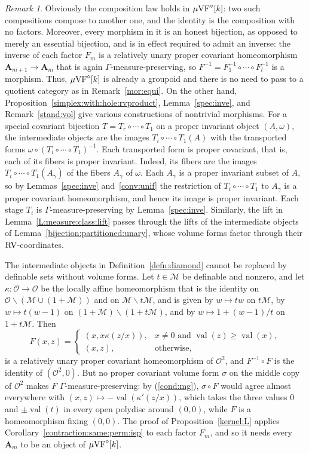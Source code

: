 \documentclass[12pt]{amsart}
\theoremstyle{plain}
\theoremstyle{definition}
\theoremstyle{remark}
\newtheorem{rem}[thm]{Remark}
\numberwithin{equation}{section}
\theoremstyle{plain}
\newcommand{\VF}{\textup{VF}}
\newcommand{\RV}{\textup{RV}}
\newcommand{\MM}{\mdl M}
\newcommand{\OO}{\mdl O}
\newcommand{\0}{\emptyset}
\newcommand{\mdl}[1]{\mathcal{#1}}  %
\newcommand{\fun}{\longrightarrow}
\newcommand{\efun}{\longmapsto}
\newcommand{\mi}{\smallsetminus}
\newcommand{\mVF}{{\mu}{\VF}}
\newcommand{\mgVF}{{\mu} {\VF}}
\DeclareMathOperator{\vv}{val}
\begin{document}
\begin{rem}\label{dia:cat:well}
Obviously the composition law holds in $\mgVF^{\diamond}[k]$: two such compositions compose to another one, and the identity is the composition with no factors. Moreover, every morphism in it is an honest bijection, as opposed to merely an essential bijection, and is in effect required to admit an inverse: the inverse of each factor $F_m$ is a relatively unary proper covariant homeomorphism $\bm A_{m+1} \fun \bm A_m$ that is again $\Gamma$-measure-preserving, so $F^{-1} = F_1^{-1} \circ \cdots \circ F_l^{-1}$ is a morphism. Thus, $\mgVF^{\diamond}[k]$ is already a groupoid and there is no need to pass to a quotient category as in Remark~\ref{mor:equi}. On the other hand, Proposition~\ref{simplex:with:hole:rvproduct}, Lemma~\ref{spec:inve}, and Remark~\ref{stand:vol} give various constructions of nontrivial morphisms. For a special covariant bijection $T = T_r \circ \cdots \circ T_1$ on a proper invariant object $(A, \omega)$, the intermediate objects are the images $T_i \circ \cdots \circ T_1(A)$ with the transported forms $\omega \circ (T_i \circ \cdots \circ T_1)^{-1}$. Each transported form is proper covariant, that is, each of its fibers is proper invariant. Indeed, its fibers are the images $T_i \circ \cdots \circ T_1(A_\gamma)$ of the fibers $A_\gamma$ of $\omega$. Each $A_\gamma$ is a proper invariant subset of $A$, so by Lemmas~\ref{spec:inve} and~\ref{conv:unif} the restriction of $T_i \circ \cdots \circ T_1$ to $A_\gamma$ is a proper covariant homeomorphism, and hence its image is proper invariant. Each stage $T_i$ is $\Gamma$-measure-preserving by Lemma~\ref{spec:inve}. Similarly, the lift in Lemma~\ref{L:measure:class:lift} passes through the lifts of the intermediate objects of Lemma~\ref{bijection:partitioned:unary}, whose volume forms factor through their $\RV$-coordinates.

The intermediate objects in Definition~\ref{defn:diamond} cannot be replaced by definable sets without volume forms. Let $t \in \MM$ be definable and nonzero, and let $\kappa : \OO \fun \OO$ be the locally affine homeomorphism that is the identity on $\OO \mi (\MM \cup (1 + \MM))$ and on $\MM \mi t\MM$, and is given by $w \efun tw$ on $t\MM$, by $w \efun t(w - 1)$ on $(1 + \MM) \mi (1 + t\MM)$, and by $w \efun 1 + (w - 1)/t$ on $1 + t\MM$. Then
\[
F(x, z) = \begin{cases} (x, x\kappa(z/x)), & x \neq 0 \text{ and } \vv(z) \geq \vv(x),\\ (x, z), & \text{otherwise},\end{cases}
\]
is a relatively unary proper covariant homeomorphism of $\OO^2$, and $F^{-1} \circ F$ is the identity of $(\OO^2, 0)$. But no proper covariant volume form $\sigma$ on the middle copy of $\OO^2$ makes $F$ $\Gamma$-measure-preserving: by (\ref{cond:mg}), $\sigma \circ F$ would agree almost everywhere with $(x, z) \efun -\vv(\kappa'(z/x))$, which takes the three values $0$ and $\pm \vv(t)$ in every open polydisc around $(0, 0)$, while $F$ is a homeomorphism fixing $(0, 0)$. The proof of Proposition~\ref{kernel:L} applies Corollary~\ref{contraction:same:perm:isp} to each factor $F_m$, and so it needs every $\bm A_m$ to be an object of $\mVF^{\diamond}[k]$.
\end{rem}
\end{document}
